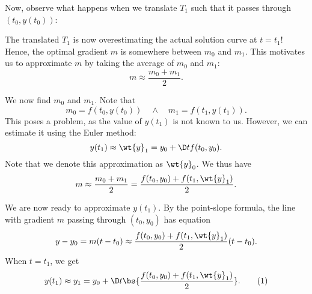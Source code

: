 Now, observe what happens when we translate $T_1$ such that it passes through $(t_0, y(t_0))$:

\begin{figure}[H]
    \centering
    \caption{}
\end{figure}

The translated $T_1$ is now overestimating the actual solution curve at $t = t_1$! Hence, the optimal gradient $m$ is somewhere between $m_0$ and $m_1$. This motivates us to approximate $m$ by taking the average of $m_0$ and $m_1$: \[m \approx \frac{m_0 + m_1}{2}.\]

We now find $m_0$ and $m_1$. Note that \[m_0 = f(t_0, y(t_0)) \quad \land \quad m_1 = f(t_1, y(t_1)).\] This poses a problem, as the value of $y(t_1)$ is not known to us. However, we can estimate it using the Euler method: \[y(t_1) \approx \wt{y}_1 = y_0 + \D t f(t_0, y_0).\] Note that we denote this approximation as $\wt{y}_0$. We thus have \[m \approx \frac{m_0 + m_1}{2} = \frac{f(t_0, y_0) + f(t_1, \wt{y}_1)}{2}.\]

We are now ready to approximate $y(t_1)$. By the point-slope formula, the line with gradient $m$ passing through $(t_0, y_0)$ has equation \[y - y_0 = m (t - t_0) \approx \frac{f(t_0, y_0) + f(t_1, \wt{y}_1)}{2} (t - t_0).\] When $t = t_1$, we get \[y(t_1) \approx y_1 = y_0 + \D t \bs{\frac{f(t_0, y_0) + f(t_1, \wt{y}_1)}{2}}. \tag{1}\]

